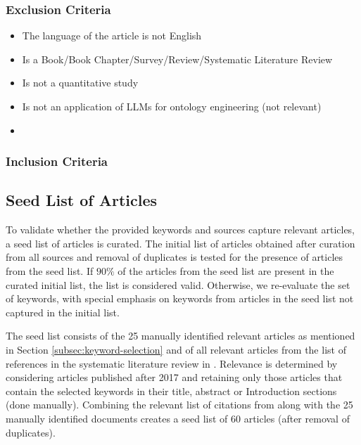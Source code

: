 \documentclass[a4paper,colorinlistoftodos]{article}
\begin{document}
\subsubsection{Exclusion Criteria}
\label{subsubsec:exclusion-criteria}

\begin{itemize}
  \item The language of the article is not English
  \item Is a Book/Book Chapter/Survey/Review/Systematic Literature Review
  \item Is not a quantitative study
  \item Is not an application of LLMs for ontology engineering (not relevant)
  \item 
\end{itemize}

\subsubsection{Inclusion Criteria}
\label{subsubsec:inclusion-criteria}

\subsection{Seed List of Articles}
\label{subsec:seed-list}

To validate whether the provided keywords and sources capture relevant
articles, a seed list of articles is curated. The initial list of articles
obtained after curation from all sources and removal of duplicates is tested
for the presence of articles from the seed list. If $90\%$ of the articles
from the seed list are present in the curated initial list, the list is
considered valid. Otherwise, we re-evaluate the set of keywords, with special
emphasis on keywords from articles in the seed list not captured in the
initial list.

The seed list consists of the 25 manually identified relevant articles as
mentioned in Section \ref{subsec:keyword-selection} and of all relevant
articles from the list of references in the systematic literature review in
\citet{li2025LargeLanguageModels}. Relevance is determined by considering
articles published after 2017 and retaining only those articles that contain
the selected keywords in their title, abstract or Introduction sections (done
manually). Combining the relevant list of citations from
\citet{li2025LargeLanguageModels} along with the 25 manually identified
documents creates a seed list of 60 articles (after removal of duplicates).




\end{document}
